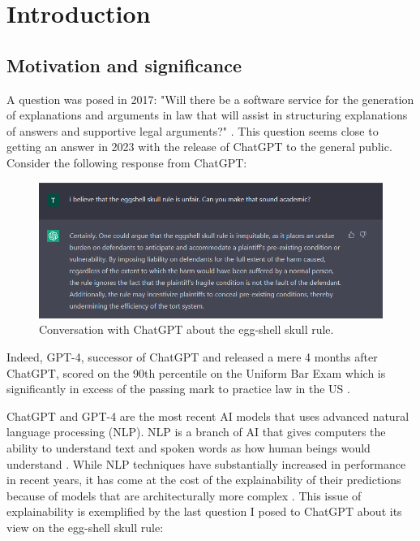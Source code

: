 \chapter{Introduction} %

\label{chapter1} %

\section{Motivation and significance}
A question was posed in 2017: "Will there be a software service for the generation of explanations and arguments in law that will assist in structuring explanations of answers and supportive legal arguments?" \cite{ashley_2017}. This question seems close to getting an answer in 2023 with the release of ChatGPT \cite{openai} to the general public. Consider the following response from ChatGPT:  

\begin{figure}[!ht]
	\centering
	\includegraphics[width=1\linewidth]{figures/chatgpt3.png}
	\caption{Conversation with ChatGPT about the egg-shell skull rule.}   
  \label{fig:chatgpt}
\end{figure}

Indeed, GPT-4, successor of ChatGPT and released a mere 4 months after ChatGPT, scored on the 90th percentile on the Uniform Bar Exam which is significantly in excess of the passing mark to practice law in the US \cite{katz2023gpt}.

ChatGPT and GPT-4 are the most recent AI models that uses advanced natural language processing (NLP). NLP is a branch of AI that gives computers the ability to understand text and spoken words as how human beings would understand \cite{ibm_nlp}. While NLP techniques have substantially increased in performance in recent years, it has come at the cost of the explainability of their predictions because of models that are architecturally more complex \cite{zini2022}. This issue of explainability is exemplified by the last question I posed to ChatGPT about its view on the egg-shell skull rule:

